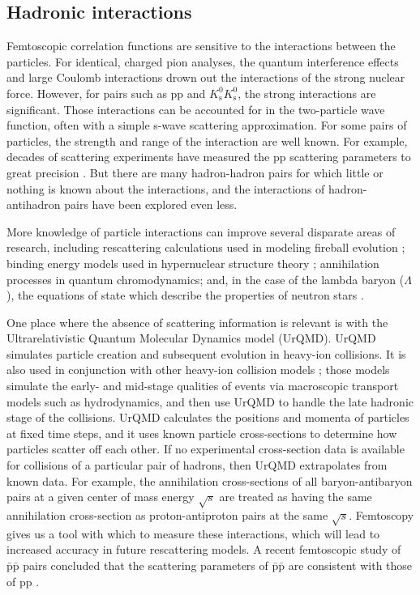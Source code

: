 \subsection{Hadronic interactions}
\label{sec:HadronicInteractions}



Femtoscopic correlation functions are sensitive to the interactions between the particles.
For identical, charged pion analyses, the quantum interference effects and large Coulomb interactions drown out the interactions of the strong nuclear force.
However, for pairs such as pp and $K^0_\mathrm{s}K^0_\mathrm{s}$, the strong interactions are significant.
Those interactions can be accounted for in the two-particle wave function, often with a simple s-wave scattering approximation.
For some pairs of particles, the strength and range of the interaction are well known. For example, decades of scattering experiments have measured the pp scattering parameters to great precision \cite{...}.
But there are many hadron-hadron pairs for which little or nothing is known about the interactions, and the interactions of hadron-antihadron pairs have been explored even less.

More knowledge of particle interactions can improve several disparate areas of research, including rescattering calculations used in modeling fireball evolution \cite{Bleicher:1999xi}; binding energy models used in hypernuclear structure theory \cite{Hiyama:2002yj,Filikhin:2002wm}; annihilation processes in quantum chromodynamics; and, in the case of the lambda baryon ($\Lambda$), the equations of state which describe the properties of neutron stars \cite{SchaffnerBielich:2008kb,Wang:2010gr}.

One place where the absence of scattering information is relevant is with the Ultrarelativistic Quantum Molecular Dynamics model (UrQMD). UrQMD simulates particle creation and subsequent evolution in heavy-ion collisions.
It is also used in conjunction with other heavy-ion collision models \cite{Bass:2000ib,Ryu:2012at,Song:2013qma}; those models simulate the early- and mid-stage qualities of events via macroscopic transport models such as hydrodynamics, and then use UrQMD to handle the late hadronic stage of the collisions.
UrQMD calculates the positions and momenta of particles at fixed time steps, and it uses known particle cross-sections to determine how particles scatter off each other.
If no experimental cross-section data is available for collisions of a particular pair of hadrons, then UrQMD extrapolates from known data.
For example, the annihilation cross-sections of all baryon-antibaryon pairs at a given center of mass energy $\sqrt{s}$ are treated as having the same annihilation cross-section as proton-antiproton pairs at the same $\sqrt{s}$.
Femtoscopy gives us a tool with which to measure these interactions, which will lead to increased accuracy in future rescattering models.
A recent femtoscopic study of $\bar{\mathrm{p}}\bar{\mathrm{p}}$ pairs concluded that the scattering parameters of $\bar{\mathrm{p}}\bar{\mathrm{p}}$ are consistent with those of pp \cite{Adamczyk:2015hza}.


